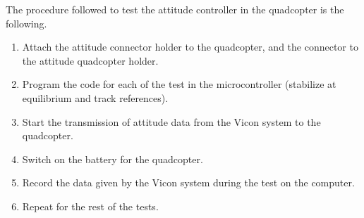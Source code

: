 	
The procedure followed to test the attitude controller in the quadcopter is the following.
\begin{enumerate}
	\item Attach the attitude connector holder to the quadcopter, and the connector to the attitude quadcopter holder.
    \item Program the code for each of the test in the microcontroller (stabilize at equilibrium and track references).
	\item Start the transmission of attitude data from the Vicon system to the quadcopter.
	\item Switch on the battery for the quadcopter.
	\item Record the data given by the Vicon system during the test on the computer.
    \item Repeat for the rest of the tests.
\end{enumerate}
 
